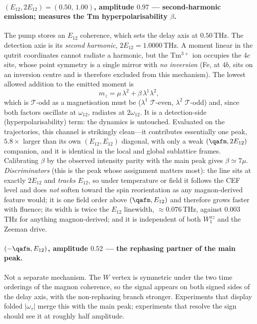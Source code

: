 \paragraph{$(E_{12},2E_{12})=(0.50,\,1.00)$, amplitude $0.97$ ---
second-harmonic emission; measures the Tm hyperpolarisability $\beta$.}
The pump stores an $E_{12}$ coherence, which sets the delay axis at
$0.50$\,THz.  The detection axis is its \emph{second harmonic},
$2E_{12}=1.0000$\,THz.  A moment linear in the qutrit coordinates
cannot radiate a harmonic, but the Tm$^{3+}$ ion occupies the $4c$
site, whose point symmetry is a single mirror with \emph{no inversion}
(Fe, at $4b$, sits on an inversion centre and is therefore excluded
from this mechanism).  The lowest allowed addition to the emitted
moment is
\begin{equation}
  m_z=\mu\,\lambda^2+\beta\,\lambda^1\lambda^2 ,
\end{equation}
which is $\mathcal T$-odd as a magnetisation must be ($\lambda^1$
$\mathcal T$-even, $\lambda^2$ $\mathcal T$-odd) and, since both factors
oscillate at $\omega_{12}$, radiates at $2\omega_{12}$.  It is a
detection-side (hyperpolarisability) term: the dynamics is untouched.
Evaluated on the trajectories, this channel is strikingly clean---it
contributes essentially one peak, $5.8\times$ larger than its own
$(E_{12},E_{12})$ diagonal, with only a weak $(\qafm,2E_{12})$
companion, and it is identical in the local and global sublattice
frames.  Calibrating $\beta$ by the observed intensity parity with the
main peak gives $\beta\simeq7\mu$.
\emph{Discriminators} (this is the peak whose assignment matters most):
the line sits at exactly $2E_{12}$ and \emph{tracks $E_{12}$}, so under
temperature or field it follows the CEF level and does \emph{not}
soften toward the spin reorientation as any magnon-derived feature
would; it is one field order above $(\qafm,E_{12})$ and therefore grows
faster with fluence; its width is twice the $E_{12}$ linewidth,
$\approx0.076$\,THz, against $0.003$\,THz for anything magnon-derived;
and it is independent of both $W^{xz}_1$ and the Zeeman drive.

\paragraph{$(-\qafm,E_{12})$, amplitude $0.52$ --- the rephasing
partner of the main peak.}
Not a separate mechanism.  The $W$ vertex is symmetric under the two
time orderings of the magnon coherence, so the signal appears on both
signed sides of the delay axis, with the non-rephasing branch stronger.
Experiments that display folded $|\omega_\tau|$ merge this with the
main peak; experiments that resolve the sign should see it at roughly
half amplitude.

